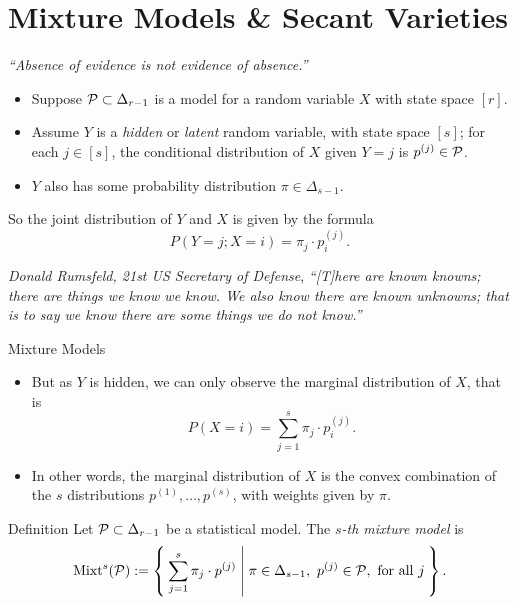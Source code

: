 \section{Mixture Models \& Secant Varieties}

\begin{frame}{ \emph{``Absence of evidence is not evidence of absence.''} }
    \begin{itemize}
    \item Suppose $\mathcal{P} \subset \Delta_{r-1}$ is a model for a random variable $X$ with state space $[r]$.
    \item Assume $Y$ is a \emph{hidden} or \emph{latent} random variable, with state space $[s]$; for each $j \in [s]$, the conditional distribution of $X$ given $Y = j$ is $p^{(j)} \in \mathcal{P}$. 
    \item $Y$ also has some probability distribution $\pi \in \Delta_{s-1}$.
    \end{itemize}

    So the joint distribution of $Y$ and $X$ is given by the formula
    $$ P(Y = j; X = i) = \pi_{j} \cdot p_{i}^{(j)}. $$

    \begin{block}{\emph{Donald Rumsfeld, 21st US Secretary of Defense}, \cite{DR2002}}
        \emph{``[T]here are known knowns; there are things we know we know. We also know there are known unknowns; that is to say we know there are some things we do not know.''}
    \end{block}

\end{frame}

\begin{frame}{Mixture Models}

    \begin{itemize}
    \item But as $Y$ is hidden, we can only observe the marginal distribution of $X$, that is
    $$ P(X = i) = \sum_{j = 1}^{s} \pi_{j} \cdot p_{i}^{(j)}. $$
    \item In other words, the marginal distribution of $X$ is the convex combination of the $s$ distributions $p^{(1)}, \ldots, p^{(s)}$, with weights given by $\pi$.
    \end{itemize}

    \begin{block}{Definition \cite{BSSSMD2009}}
        Let $\mathcal{P} \subset \Delta_{r-1}$ be a statistical model. The \emph{$s$-th mixture model} is
        $$ \Mixt^{s}(\mc{P}) := \Set{ \sum_{j = 1}^{s} \pi_{j}\cdot p^{(j)} | \pi \in \Delta_{s-1},\ p^{(j)} \in \mc{P}, \text{ for all } j }. $$
    \end{block}

\end{frame}


